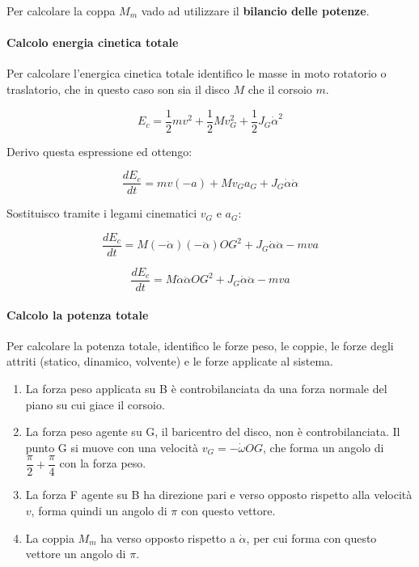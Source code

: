 \documentclass[main.tex]{subfiles}
\begin{document}
Per calcolare la coppa $M_m$ vado ad utilizzare il \textbf{bilancio delle potenze}.

\paragraph{Calcolo energia cinetica totale} Per calcolare l'energica cinetica totale identifico le masse in moto rotatorio o traslatorio, che in questo caso son sia il disco $M$ che il corsoio $m$.

\begin{center}
\end{center}

\[
	E_c = \dfrac{1}{2}mv^2 + \dfrac{1}{2}Mv_G^2 + \dfrac{1}{2}J_G\dot{\alpha}^2
\]

Derivo questa espressione ed ottengo:

\[
	\dfrac{dE_c}{dt} = mv(-a) + Mv_Ga_G + J_G\dot{\alpha}\ddot{\alpha}
\]

Sostituisco tramite i legami cinematici $v_G$ e $a_G$:

\[
	\dfrac{dE_c}{dt} = M(-\dot{\alpha})(-\ddot{\alpha})OG^2 + J_G\dot{\alpha}\ddot{\alpha} -mva
\]

\[
	\dfrac{dE_c}{dt} = M\dot{\alpha}\ddot{\alpha}OG^2 + J_G\dot{\alpha}\ddot{\alpha} -mva
\]

\paragraph{Calcolo la potenza totale} Per calcolare la potenza totale, identifico le forze peso, le coppie, le forze degli attriti (statico, dinamico, volvente) e le forze applicate al sistema.

\begin{enumerate}
\item La forza peso applicata su B è controbilanciata da una forza normale del piano su cui giace il corsoio.
\item La forza peso agente su G, il baricentro del disco, non è controbilanciata. Il punto G si muove con una velocità $v_G = -\dot{\omega}OG$, che forma un angolo di $\dfrac{\pi}{2} + \dfrac{\pi}{4}$ con la forza peso.
\item La forza F agente su B ha direzione pari e verso opposto rispetto alla velocità $v$, forma quindi un angolo di $\pi$ con questo vettore.
\item La coppia $M_m$ ha verso opposto rispetto a $\dot{\alpha}$, per cui forma con questo vettore un angolo di $\pi$.
\end{enumerate}
\end{document}
